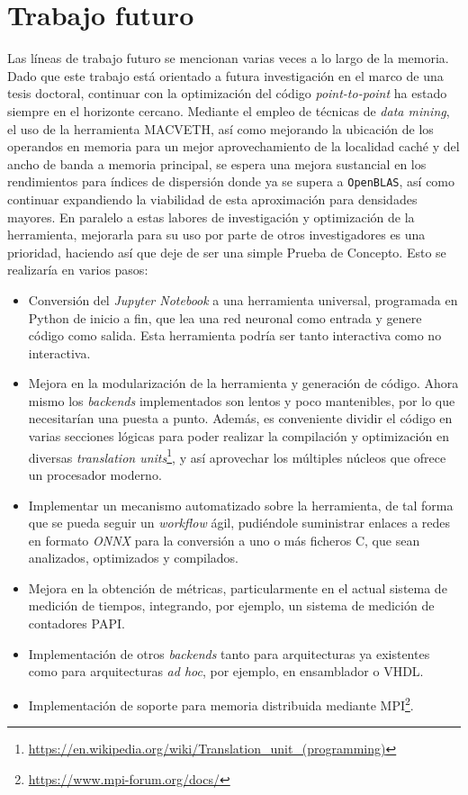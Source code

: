 \section{Trabajo futuro}
Las líneas de trabajo futuro se mencionan varias veces a lo largo de la memoria. Dado que este trabajo está orientado a futura investigación en el marco de una tesis doctoral, continuar con la optimización del código \textit{point-to-point} ha estado siempre en el horizonte cercano. Mediante el empleo de técnicas de \textit{data mining}, el uso de la herramienta MACVETH, así como mejorando la ubicación de los operandos en memoria para un mejor aprovechamiento de la localidad caché y del ancho de banda a memoria principal, se espera una mejora sustancial en los rendimientos para índices de dispersión donde ya se supera a \texttt{OpenBLAS}, así como continuar expandiendo la viabilidad de esta aproximación para densidades mayores. En paralelo a estas labores de investigación y optimización de la herramienta, mejorarla para su uso por parte de otros investigadores es una prioridad, haciendo así que deje de ser una simple Prueba de Concepto. Esto se realizaría en varios pasos: 
\begin{itemize}
    \item Conversión del \textit{Jupyter Notebook} a una herramienta universal, programada en Python de inicio a fin, que lea una red neuronal como entrada y genere código como salida. Esta herramienta podría ser tanto interactiva como no interactiva.
    \item Mejora en la modularización de la herramienta y generación de código. Ahora mismo los \textit{backends} implementados son lentos y poco mantenibles, por lo que necesitarían una puesta a punto. Además, es conveniente dividir el código en varias secciones lógicas para poder realizar la compilación y optimización en diversas \textit{translation units}\footnote{\url{https://en.wikipedia.org/wiki/Translation_unit_(programming)}}, y así aprovechar los múltiples núcleos que ofrece un procesador moderno.
    \item Implementar un mecanismo automatizado sobre la herramienta, de tal forma que se pueda seguir un \textit{workflow} ágil, pudiéndole suministrar enlaces a redes en formato \textit{ONNX} para la conversión a uno o más ficheros C, que sean analizados, optimizados y compilados.
    \item Mejora en la obtención de métricas, particularmente en el actual sistema de medición de tiempos, integrando, por ejemplo, un sistema de medición de contadores PAPI.
    \item Implementación de otros \textit{backends} tanto para arquitecturas ya existentes como para arquitecturas \textit{ad hoc}, por ejemplo, en ensamblador o VHDL.
    \item Implementación de soporte para memoria distribuida mediante MPI\footnote{\url{https://www.mpi-forum.org/docs/}}.
\end{itemize}
